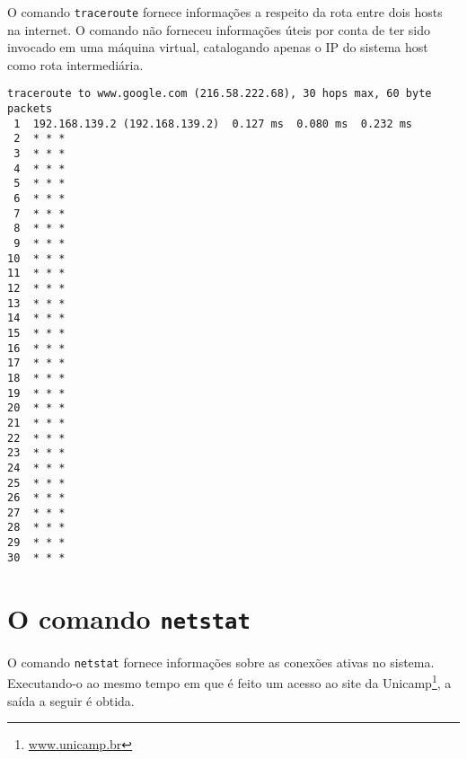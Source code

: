 \documentclass[a4paper,10pt]{article}
\begin{document}
O comando {\tt traceroute} fornece informações a respeito da rota entre dois hosts na internet. O comando não forneceu informações úteis por conta de ter sido invocado em uma máquina virtual, catalogando apenas o IP do sistema host como rota intermediária.

\begin{lstlisting}
traceroute to www.google.com (216.58.222.68), 30 hops max, 60 byte packets
 1  192.168.139.2 (192.168.139.2)  0.127 ms  0.080 ms  0.232 ms
 2  * * *
 3  * * *
 4  * * *
 5  * * *
 6  * * *
 7  * * *
 8  * * *
 9  * * *
10  * * *
11  * * *
12  * * *
13  * * *
14  * * *
15  * * *
16  * * *
17  * * *
18  * * *
19  * * *
20  * * *
21  * * *
22  * * *
23  * * *
24  * * *
25  * * *
26  * * *
27  * * *
28  * * *
29  * * *
30  * * *

\end{lstlisting}

\section{O comando {\tt netstat}}
O comando {\tt netstat} fornece informações sobre as conexões ativas no sistema.\\

Executando-o ao mesmo tempo em que é feito um acesso ao site da Unicamp\footnote{\url{www.unicamp.br}}, a saída a seguir é obtida.
\end{document}
